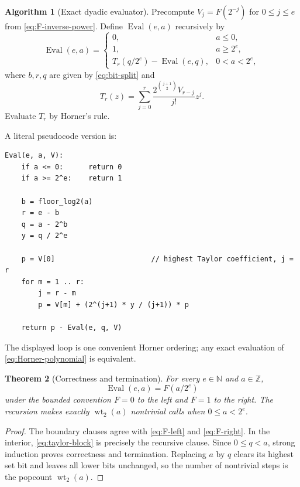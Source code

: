\documentclass[11pt,oneside]{article}
\newtheorem{theorem}{Theorem}[section]
\theoremstyle{definition}
\newtheorem{algorithm}[theorem]{Algorithm}
\theoremstyle{remark}
\newcommand{\N}{\mathbb N}
\newcommand{\Z}{\mathbb Z}
\newcommand{\wt}{\operatorname{wt}_2}
\begin{document}
\begin{algorithm}[Exact dyadic evaluator]
\label{alg:dyadic-evaluator}
Precompute $V_j=F(2^{-j})$ for $0\le j\le e$ from
\eqref{eq:F-inverse-power}.  Define $\operatorname{Eval}(e,a)$ recursively by
\begin{equation*}
 \operatorname{Eval}(e,a)=
 \begin{cases}
  0,&a\le0,\\
  1,&a\ge2^e,\\
  T_r(q/2^e)-\operatorname{Eval}(e,q),&0<a<2^e,
 \end{cases}
\end{equation*}
where $b,r,q$ are given by \eqref{eq:bit-split} and
\begin{equation}
 T_r(z)=\sum_{j=0}^{r}
 \frac{2^{\binom{j+1}{2}}V_{r-j}}{j!}z^j.                 \label{eq:Horner-polynomial}
\end{equation}
Evaluate $T_r$ by Horner's rule.
\end{algorithm}

A literal pseudocode version is:
\begin{lstlisting}[style=pseudo]
Eval(e, a, V):
    if a <= 0:      return 0
    if a >= 2^e:    return 1

    b = floor_log2(a)
    r = e - b
    q = a - 2^b
    y = q / 2^e

    p = V[0]                       // highest Taylor coefficient, j = r
    for m = 1 .. r:
        j = r - m
        p = V[m] + (2^(j+1) * y / (j+1)) * p

    return p - Eval(e, q, V)
\end{lstlisting}
The displayed loop is one convenient Horner ordering; any exact evaluation of
\eqref{eq:Horner-polynomial} is equivalent.

\begin{theorem}[Correctness and termination]
For every $e\in\N$ and $a\in\Z$,
\begin{equation}
 \operatorname{Eval}(e,a)=F(a/2^e)                        \label{eq:evaluator-correct}
\end{equation}
under the bounded convention $F=0$ to the left and $F=1$ to the right.  The recursion makes
exactly $\wt(a)$ nontrivial calls when $0\le a<2^e$.
\end{theorem}

\begin{proof}
The boundary clauses agree with \eqref{eq:F-left} and \eqref{eq:F-right}.  In the interior,
\eqref{eq:taylor-block} is precisely the recursive clause.  Since
$0\le q<a$, strong induction proves correctness and termination.  Replacing $a$ by $q$
clears its highest set bit and leaves all lower bits unchanged, so the number of nontrivial
steps is the popcount $\wt(a)$.
\end{proof}
\end{document}
